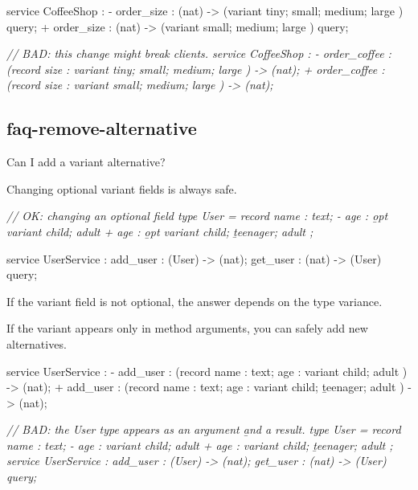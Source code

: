 \documentclass{article}
\begin{document}
\begin{code}[good]
 service CoffeeShop : {
-  order_size : (nat) -> (variant { tiny; small; medium; large }) query;
+  order_size : (nat) -> (variant {       small; medium; large }) query;
 }
\end{code}

\begin{code}[bad]
 \em{// BAD: this change might break clients.}
 service CoffeeShop : {
-  order_coffee : (record { size : variant { tiny; small; medium; large } }) -> (nat);
+  order_coffee : (record { size : variant {       small; medium; large } }) -> (nat);
 }
\end{code}

\subsection{faq-remove-alternative}{Can I add a variant alternative?}

Changing optional variant fields is always safe.

\begin{code}[good]
 \em{// OK: changing an optional field}
 type User = record {
   name : text;
-  age : \b{opt} variant { child;           adult }
+  age : \b{opt} variant { child; \b{teenager;} adult }
};

 service UserService : {
   add_user : (User) -> (nat);
   get_user : (nat) -> (User) query;
 }
\end{code}

If the variant field is not optional, the answer depends on the type variance.

If the variant appears only in method arguments, you can safely add new alternatives.

\begin{code}[good]
 service UserService : {
-  add_user : (record { name : text;  age : variant { child;           adult }}) -> (nat);
+  add_user : (record { name : text;  age : variant { child; \b{teenager}; adult }}) -> (nat);
 }
\end{code}

\begin{code}[bad]
\em{// BAD: the User type appears as an argument \b{and} a result.}
 type User = record {
   name : text;
-  age : variant { child;           adult }
+  age : variant { child; \b{teenager;} adult }
 };
 service UserService : {
   add_user : (User) -> (nat);
   get_user : (nat) -> (User) query;
 }
\end{code}
\end{document}
